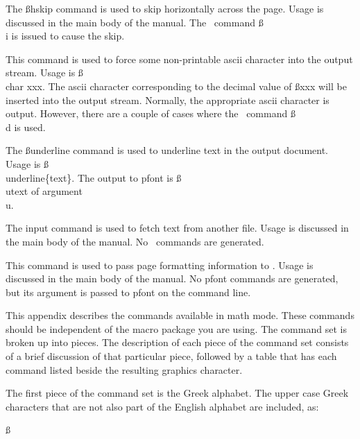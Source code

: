 { The {\ss hskip command} is used to skip horizontally
across the page. Usage is discussed in the main body of the
manual. The \pfont\ command {\ss \\i} is issued to cause the skip.

 This command is used to force some non-printable
ascii character into the output stream. Usage is {\ss \\char
xxx}. The ascii character corresponding to the decimal value of
{\ss xxx} will be inserted into the output stream. Normally, the
appropriate ascii character is output. However, there are a
couple of cases where the \pfont\ command {\ss \\d} is used.

 The {\ss underline} command is used to underline
text in the output document. Usage is {\ss \\underline\{text\}.}
The output to pfont is {\ss \\utext of argument\\u.}

 The input command is used to fetch text from another
file. Usage is discussed in the main body of the manual. No
\pfont\ commands are generated.

 This command is used to pass page formatting
information to \pfont. Usage is discussed in the main body of the
manual. No pfont commands are generated, but its argument is
passed to pfont on the command line.

}		%


This appendix  describes the commands available in math mode.
These commands should be independent of the macro package you are
using. The command set is broken up into pieces. The description
of each piece of the command set consists of a brief discussion
of that particular piece, followed by a table that has each
command listed beside the resulting graphics character.

The first piece of the command set is the Greek alphabet. The
upper case Greek characters that are not also part of the English
alphabet are included, as:{\ss{}

		
		
		
	}

